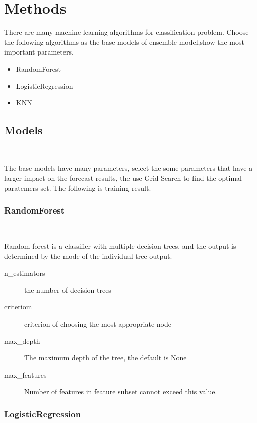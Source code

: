 \section{Methods}

There are many machine learning algorithms 
for classification problem. 
Choose the following algorithms
as the base models of ensemble model,show the most important parameters.

\begin{itemize}
	\item RandomForest 
	\item LogisticRegression

	\item KNN

\end{itemize}
\subsection{Models}
\

The base models have many parameters,
select the some parameters that 
have a larger impact on 
the forecast results,
the use Grid Search to find 
the optimal paratemers set.	
The following is training result. 
\subsubsection{RandomForest}
\

Random forest is a classifier with 
multiple decision trees, and
the output is determined by 
the mode of the individual tree output.


\begin{description}
	\item[n_estimators] the number of decision trees
	\item[criteriom] criterion of choosing 
	the most appropriate node
	\item[max_depth] The maximum depth of the tree, 
	the default is None 
	\item[max_features] Number of features in feature subset cannot exceed this value.
\end{description}




\subsubsection{LogisticRegression}
\

